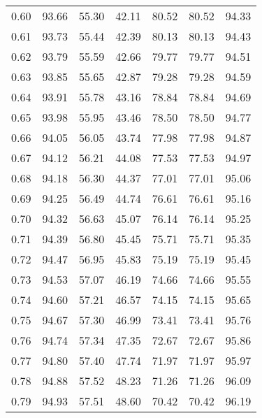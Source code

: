 \begin{tabular}{|c|c|c|c|c|c|c|}
      0.60 &     93.66 &     55.30 &      42.11 &   80.52 &      80.52 &         94.33 \\
      0.61 &     93.73 &     55.44 &      42.39 &   80.13 &      80.13 &         94.43 \\
      0.62 &     93.79 &     55.59 &      42.66 &   79.77 &      79.77 &         94.51 \\
      0.63 &     93.85 &     55.65 &      42.87 &   79.28 &      79.28 &         94.59 \\
      0.64 &     93.91 &     55.78 &      43.16 &   78.84 &      78.84 &         94.69 \\
      0.65 &     93.98 &     55.95 &      43.46 &   78.50 &      78.50 &         94.77 \\
      0.66 &     94.05 &     56.05 &      43.74 &   77.98 &      77.98 &         94.87 \\
      0.67 &     94.12 &     56.21 &      44.08 &   77.53 &      77.53 &         94.97 \\
      0.68 &     94.18 &     56.30 &      44.37 &   77.01 &      77.01 &         95.06 \\
      0.69 &     94.25 &     56.49 &      44.74 &   76.61 &      76.61 &         95.16 \\
      0.70 &     94.32 &     56.63 &      45.07 &   76.14 &      76.14 &         95.25 \\
      0.71 &     94.39 &     56.80 &      45.45 &   75.71 &      75.71 &         95.35 \\
      0.72 &     94.47 &     56.95 &      45.83 &   75.19 &      75.19 &         95.45 \\
      0.73 &     94.53 &     57.07 &      46.19 &   74.66 &      74.66 &         95.55 \\
      0.74 &     94.60 &     57.21 &      46.57 &   74.15 &      74.15 &         95.65 \\
      0.75 &     94.67 &     57.30 &      46.99 &   73.41 &      73.41 &         95.76 \\
      0.76 &     94.74 &     57.34 &      47.35 &   72.67 &      72.67 &         95.86 \\
      0.77 &     94.80 &     57.40 &      47.74 &   71.97 &      71.97 &         95.97 \\
      0.78 &     94.88 &     57.52 &      48.23 &   71.26 &      71.26 &         96.09 \\
      0.79 &     94.93 &     57.51 &      48.60 &   70.42 &      70.42 &         96.19 \\

\end{tabular}

